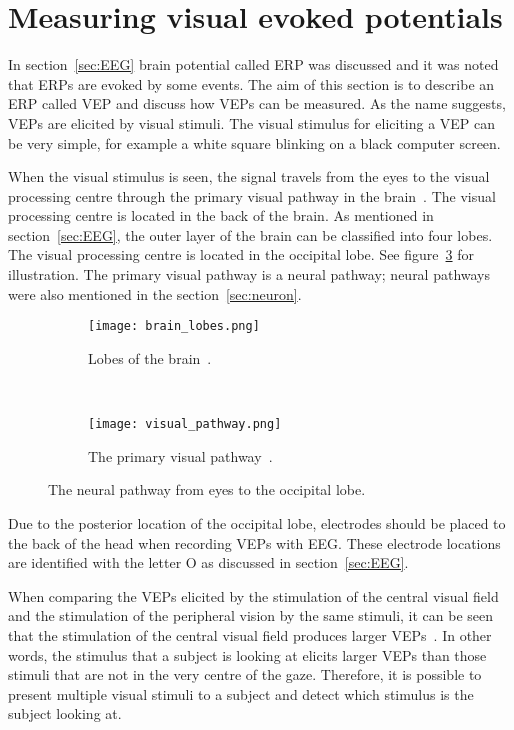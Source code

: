 \section{Measuring visual evoked potentials}
\label{sec:VEP}

In section~\ref{sec:EEG} brain potential called \gls{ERP} was discussed and it was noted that \glspl{ERP} are evoked by some events. The aim of this section is to describe an \gls{ERP} called \gls{VEP} and discuss how \glspl{VEP} can be measured. As the name suggests, \glspl{VEP} are elicited by visual stimuli. The visual stimulus for eliciting a \gls{VEP} can be very simple, for example a white square blinking on a black computer screen.

When the visual stimulus is seen, the signal travels from the eyes to the \gls{visual processing centre} through the \gls{primary visual pathway} in the brain~\cite{neuroscience}. The \gls{visual processing centre} is located in the back of the brain. As mentioned in section~\ref{sec:EEG}, the outer layer of the brain can be classified into four lobes. The \gls{visual processing centre} is located in the occipital lobe. See figure~\ref{fig:lobes_pathway} for illustration. The \gls{primary visual pathway} is a \gls{neural pathway}; \glspl{neural pathway} were also mentioned in the section~\ref{sec:neuron}.

\begin{figure}[h!]
	\centering
	\begin{subfigure}[b]{0.48\textwidth}
		\texttt{[image: brain\_lobes.png]}
		\caption{Lobes of the brain~\cite{blausen}.}
		\label{fig:brain_lobes}
	\end{subfigure}
	~
	\begin{subfigure}[b]{0.48\textwidth}
		\texttt{[image: visual\_pathway.png]}
		\caption{The primary visual pathway~\cite[p.~261]{neuroscience}.}
		\label{fig:visual_pathway}
	\end{subfigure}
	\caption{The neural pathway from eyes to the occipital lobe.}
	\label{fig:lobes_pathway}
\end{figure}

Due to the posterior location of the occipital lobe, electrodes should be placed to the back of the head when recording \glspl{VEP} with \gls{EEG}. These electrode locations are identified with the letter O as discussed in section~\ref{sec:EEG}.

When comparing the \glspl{VEP} elicited by the stimulation of the \gls{central visual field} and the stimulation of the \gls{peripheral vision} by the same stimuli, it can be seen that the stimulation of the \gls{central visual field} produces larger \glspl{VEP}~\cite{VEP_size}. In other words, the stimulus that a subject is looking at elicits larger \glspl{VEP} than those stimuli that are not in the very centre of the gaze. Therefore, it is possible to present multiple visual stimuli to a subject and detect which stimulus is the subject looking at. 

